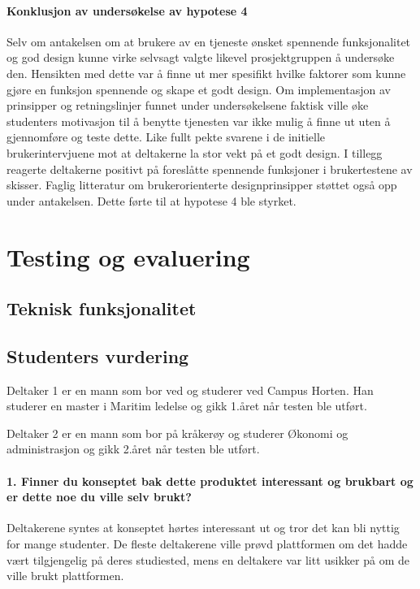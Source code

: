 \paragraph{Konklusjon av undersøkelse av hypotese 4}
Selv om antakelsen om at brukere av en tjeneste ønsket spennende funksjonalitet og god design kunne virke selvsagt valgte likevel prosjektgruppen å undersøke den. Hensikten med dette var å finne ut mer spesifikt hvilke faktorer som kunne gjøre en funksjon spennende og skape et godt design. Om implementasjon av prinsipper og retningslinjer funnet under undersøkelsene faktisk ville øke studenters motivasjon til å benytte tjenesten var ikke mulig å finne ut uten å gjennomføre og teste dette. Like fullt pekte svarene i de initielle brukerintervjuene mot at deltakerne la stor vekt på et godt design. I tillegg reagerte deltakerne positivt på foreslåtte spennende funksjoner i brukertestene av skisser. Faglig litteratur om brukerorienterte designprinsipper støttet også opp under antakelsen. Dette førte til at hypotese 4 ble styrket.


\section{Testing og evaluering}

\subsection{Teknisk funksjonalitet}

\subsection{Studenters vurdering}
Deltaker 1 er en mann som bor ved og studerer ved Campus Horten. Han studerer en master i Maritim ledelse og gikk 1.året når testen ble utført.

Deltaker 2 er en mann som bor på kråkerøy og studerer Økonomi og administrasjon og gikk 2.året når testen ble utført. %
\paragraph{1. Finner du konseptet bak dette produktet interessant og brukbart og er dette noe du ville selv brukt?}
Deltakerene syntes at konseptet hørtes interessant ut og tror det kan bli nyttig for mange studenter. De fleste deltakerene ville prøvd plattformen om det hadde vært tilgjengelig på deres studiested, mens en deltakere var litt usikker på om de ville brukt plattformen.

